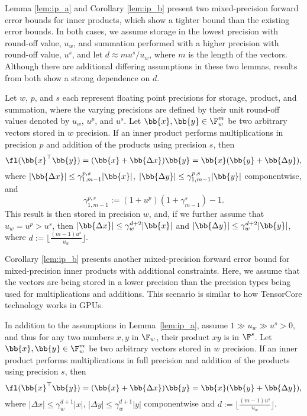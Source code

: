 Lemma \ref{lem:ip_a} and Corollary \ref{lem:ip_b} present two mixed-precision forward error bounds for inner products, which show a tighter bound than the existing error bounds. 
In both cases, we assume storage in the lowest precision with round-off value, $u_w$, and summation performed with a higher precision with round-off value, $u^{s}$, and let $d \approx m u^{s} / u_w$,
where $m$ is the length of the vectors. 
Although there are additional differing assumptions in these two lemmas, results from both show a strong dependence on $d$.
\begin{lemma}
	\label{lem:ip_a}
	Let $w$, $p$, and $s$ each represent floating point precisions for storage, product, and summation, where the varying precisions are defined by their unit round-off values denoted by $u_w$, $u^{p}$, and $u^{s}$.
	Let $\bb{x},\bb{y}\in \F_w^{m}$ be two arbitrary vectors stored in $w$ precision.
	If an inner product performs multiplications in precision $p$ and addition of the products using precision $s$, then
	\begin{equation}
	\fl(\bb{x}^{\top}\bb{y}) = (\bb{x}+\bb{\Delta x}) \bb{y} = \bb{x}(\bb{y}+\bb{\Delta y}),
	\end{equation}
	where $|\bb{\Delta x}|\leq \gamma^{p,s}_{1,m-1}|\bb{x}|$, $|\bb{\Delta y}|\leq \gamma^{p,s}_{1,m-1}|\bb{y}|$ componentwise, and $$\gamma^{p,s}_{1,m-1} := (1+u^{p})(1+\gamma^{s}_{m-1})-1.$$
	This result is then stored in precision $w$, and, if we further assume that $u_w=u^{p}>u^{s}$, then $|\bb{\Delta x}|\leq \gamma_w^{d+2}|\bb{x}|$ and $|\bb{\Delta y}|\leq \gamma_w^{d+2}|\bb{y}|$, where $d:=\lfloor\frac{(m-1)u^{s}}{u_w}\rfloor$.
\end{lemma}

Corollary \ref{lem:ip_b} presents another mixed-precision forward error bound for mixed-precision inner products with additional constraints.
Here, we assume that the vectors are being stored in a lower precision than the precision types being used for multiplications and additions.
This scenario is similar to how TensorCore technology works in GPUs.

\begin{corollary}
	\label{lem:ip_b}
	In addition to the assumptions in Lemma~\ref{lem:ip_a}, assume $1\gg u_w \gg u^{s}>0$, and thus for any two numbers $x,y$ in $\F_w$, their product $xy$ is in $\F^{s}$.
	Let $\bb{x},\bb{y}\in \F_w^m$ be two arbitrary vectors stored in $w$ precision.
	If an inner product performs multiplications in full precision and addition of the products using precision $s$, then
	\begin{equation}
	\fl(\bb{x}^{\top}\bb{y}) = (\bb{x}+\bb{\Delta x}) \bb{y} = \bb{x}(\bb{y}+\bb{\Delta y}),
	\end{equation}
	where $|\Delta x|\leq \gamma_w^{d+1}|x|$, $|\Delta y|\leq \gamma_w^{d+1}|y|$ componentwise and $d:=\lfloor\frac{(m-1)u^{s}}{u_w}\rfloor$.
\end{corollary}

